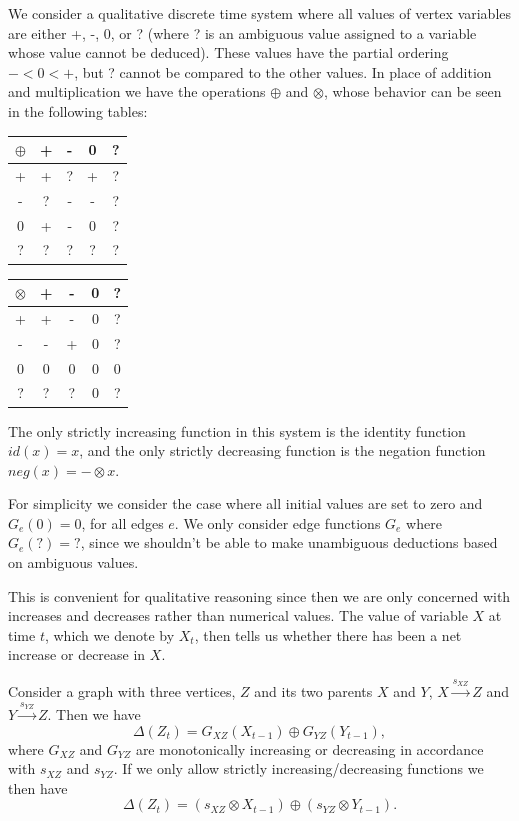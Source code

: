 \documentclass[]{article}
\begin{document}
We consider a qualitative discrete time system where all values of
vertex variables are either +, -, 0, or ? (where ? is an ambiguous value assigned
to a variable whose value cannot be deduced). These values have the partial
ordering $- < 0 < +$, but ? cannot be compared to the other values. In place of
addition and multiplication we have the operations $\oplus$ and $\otimes$, whose
behavior can be seen in the following tables:
\begin{center}
\begin{tabular}{c|cccc}
$\oplus$ & + & - & 0 & ?\\
\hline
  +   & +  & ? & + & ?\\
  -   & ?  & - & - & ?\\
  0   & +  & - & 0 & ?\\
  ?   & ?  & ? & ? & ?\\
\end{tabular}
\quad
\begin{tabular}{c|cccc}
$\otimes$ & + & - & 0 & ?\\
\hline
  +   & +  & - & 0 & ?\\
  -   & -  & + & 0 & ?\\
  0   & 0  & 0 & 0 & 0\\
  ?   & ?  & ? & 0 & ?\\
\end{tabular}
\end{center}
The only
strictly increasing function in this system is the identity function $id(x) =
x$, and the only strictly decreasing function is the negation function $neg(x) =-\otimes x$.

For simplicity we consider the case where all initial values are
set to zero and $G_e(0)=0$, for all edges $e$. We only consider edge functions
$G_e$ where $G_e(?) = ?$, since we shouldn't be able to make unambiguous
deductions based on ambiguous values.
%

This is convenient for qualitative reasoning since then we are only
concerned with increases and decreases rather than numerical values.
%
The value of variable $X$ at time $t$, which we denote by $X_t$, then tells us whether there has been a net
increase or decrease in $X$.

Consider a graph with three vertices, $Z$ and its two parents
$X$ and $Y$, $X\xrightarrow{s_{XZ}} Z$ and $Y\xrightarrow{s_{YZ}} Z$.
%
Then we have
\[\Delta(Z_t) = G_{XZ}(X_{t-1}) \oplus G_{YZ}(Y_{t-1}),\]
where $G_{XZ}$ and $G_{YZ}$ are monotonically increasing or decreasing in
accordance with $s_{XZ}$ and $s_{YZ}$.
%
If we only allow strictly increasing/decreasing functions we then have
\[\Delta(Z_t) = (s_{XZ}\otimes X_{t-1})\oplus (s_{YZ}\otimes Y_{t-1}).\]
\end{document}
